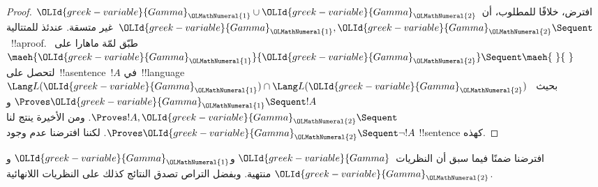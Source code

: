 \documentclass[../../../include/open-logic-section]{subfiles}
\begin{document}
\begin{proof}
  افترض، خلافًا للمطلوب، أن~$\OLId{greek-variable}{Gamma}_\OLMathNumeral{1} \cup \OLId{greek-variable}{Gamma}_\OLMathNumeral{2}$ غير متسقة. عندئذ
  للمتتالية~$\OLId{greek-variable}{Gamma}_\OLMathNumeral{1}, \OLId{greek-variable}{Gamma}_\OLMathNumeral{2} \Sequent \ $~!!a{proof}. طبّق لمّة
  ماهارا على~$\maeh{\OLId{greek-variable}{Gamma}_\OLMathNumeral{1}}{\OLId{greek-variable}{Gamma}_\OLMathNumeral{2}} \Sequent \maeh{\ }{\ }$
  لتحصل على~!!a{sentence}~$!A$ في~!!{language}~$\Lang L(\OLId{greek-variable}{Gamma}_\OLMathNumeral{1})
  \cap \Lang L(\OLId{greek-variable}{Gamma}_\OLMathNumeral{2})$ بحيث~$\Proves \OLId{greek-variable}{Gamma}_\OLMathNumeral{1} \Sequent !A$ و
  $\Proves !A, \OLId{greek-variable}{Gamma}_\OLMathNumeral{2} \Sequent \quad$. ومن الأخيرة ينتج لنا
  $\Proves \OLId{greek-variable}{Gamma}_\OLMathNumeral{2} \Sequent \lnot !A$. لكننا افترضنا عدم وجود
  !!{sentence} كهذه.
\end{proof}

افترضنا ضمنًا فيما سبق أن النظريات~$\OLId{greek-variable}{Gamma}$ و$\OLId{greek-variable}{Gamma}_\OLMathNumeral{1}$ و$\OLId{greek-variable}{Gamma}_\OLMathNumeral{2}$
منتهية. وبفضل التراص تصدق النتائج كذلك على النظريات اللانهائية.
\end{document}
